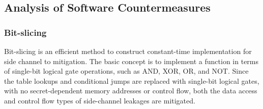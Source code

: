 \subsection{Analysis of Software Countermeasures}\label{sec:eval_countermeasures}
\subsubsection{Bit-slicing}

Bit-slicing is an efficient method to construct constant-time implementation for
side channel to mitigation. The basic concept is to
implement a function in terms of single-bit logical gate operations, such as AND, XOR, OR,
and NOT\@.
Since the table lookups and conditional jumps are replaced with single-bit
logical gates, with no secret-dependent memory addresses or control flow, both
the data access and control flow types of side-channel leakages are mitigated.

